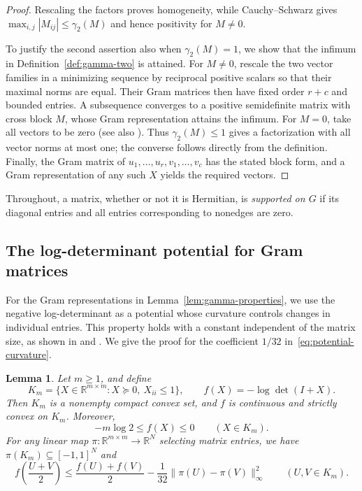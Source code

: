 \documentclass[11pt]{article}
\numberwithin{equation}{section}
\newtheorem{lemma}[theorem]{Lemma}
\theoremstyle{definition}
\theoremstyle{remark}
\newcommand{\R}{\mathbb R}
\begin{document}
\begin{proof}
Rescaling the factors proves homogeneity, while Cauchy--Schwarz gives
$\max_{i,j}|M_{ij}|\leq\gamma_2(M)$ and hence positivity for $M\ne0$.

To justify the second assertion also when $\gamma_2(M)=1$, we show
that the infimum in Definition~\ref{def:gamma-two} is attained.
For $M\ne0$, rescale the two vector families in a minimizing sequence
by reciprocal positive scalars so that their maximal norms are equal.
Their Gram matrices then have fixed order $r+c$ and bounded entries.
A subsequence converges to a positive semidefinite matrix with cross
block $M$, whose Gram representation attains the infimum.
For $M=0$, take all vectors to be zero
(see also \cite[Section~3.3]{LMSS}).
Thus $\gamma_2(M)\leq1$ gives a factorization with all vector norms
at most one; the converse follows directly from the definition.
Finally, the Gram matrix of $u_1,\ldots,u_r,v_1,\ldots,v_c$ has the
stated block form, and a Gram representation of any such $X$ yields
the required vectors.
\end{proof}

Throughout, a matrix, whether or not it is Hermitian, is
\emph{supported on $G$} if its diagonal entries and all entries
corresponding to nonedges are zero.
\subsection{The log-determinant potential for Gram matrices}
\label{sec:logdet}

For the Gram representations in Lemma~\ref{lem:gamma-properties},
we use the negative log-determinant as a potential whose curvature
controls changes in individual entries. This property holds with a
constant independent of the matrix size, as shown in
\cite[Lemma~8 in the full version]{Christiano} and \cite[Proposition~5.1]{MHT}. We give the proof for the coefficient
$1/32$ in~\eqref{eq:potential-curvature}.

\begin{lemma}\label{lem:logdet}
Let $m\geq1$, and define
\[
 K_m=\{X\in\R^{m\times m}:X\succeq0,\ X_{ii}\leq1\},
 \qquad
 f(X)=-\log\det(I+X).
\]
Then $K_m$ is a nonempty compact convex set, and $f$ is continuous
and strictly convex on $K_m$. Moreover,
\begin{equation}\label{eq:logdet-range}
 -m\log2\leq f(X)\leq0
 \qquad(X\in K_m).
\end{equation}
For any linear map $\pi:\R^{m\times m}\to\R^N$ selecting matrix
entries, we have $\pi(K_m)\subseteq[-1,1]^N$ and
\begin{equation}\label{eq:potential-curvature}
 f\left(\frac{U+V}{2}\right)
 \leq
 \frac{f(U)+f(V)}2
 -\frac1{32}\|\pi(U)-\pi(V)\|_\infty^2
 \qquad(U,V\in K_m).
\end{equation}
\end{lemma}
\end{document}
